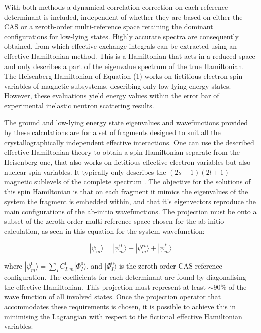 \documentclass[10pt]{article}
\begin{document}
With both methods a dynamical correlation correction on each reference determinant is included, independent of whether they are based on either the CAS or a zeroth-order multi-reference space retaining the dominant configurations for low-lying states. Highly accurate spectra are consequently obtained, from which effective-exchange integrals can be extracted using an effective Hamiltonian method. This is a Hamiltonian that acts in a reduced space and only describes a part of the eigenvalue spectrum of the true Hamiltonian. The Heisenberg Hamiltonian of Equation (1) works on fictitious electron spin variables of magnetic subsystems, describing only low-lying energy states. However, these evaluations yield energy values within the error bar of experimental inelastic neutron scattering results.

The ground and low-lying energy state eigenvalues and wavefunctions provided by these calculations are for a set of fragments designed to suit all the crystallographically independent effective interactions. One can use the described effective Hamiltonian theory to obtain a spin Hamiltonian separate from the Heisenberg one, that also works on fictitious effective electron variables but also nuclear spin variables. It typically only describes the $(2s+1)(2l+1)$ magnetic sublevels of the complete spectrum \cite{mostafanejad2014basics}. The objective for the solutions of this spin Hamiltonian is that on each fragment it mimics the eigenvalues of the system the fragment is embedded within, and that it's eigenvectors reproduce the main configurations of the ab-initio wavefunctions. The projection must be onto a subset of the zeroth-order multi-reference space chosen for the ab-initio calculation, as seen in this equation for the system wavefunction\cite{gelle2009accurate}:

\begin{equation*}
	|\psi_m\rangle = |\psi^0_m\rangle + |\psi^{ct}_m\rangle + |\psi^*_m\rangle
\end{equation*}

where $|\psi^0_m\rangle = \sum_{I}C^0_{I,m}|\Phi^0_I\rangle$, and $|\Phi^0_I\rangle$ is the zeroth order CAS reference configuration. The coefficients for each determinant are found by diagonalising the effective Hamiltonian. This projection must represent at least $\sim90\%$ of the wave function of all involved states. Once the projection operator that accommodates these requirements is chosen, it is possible to achieve this in minimising the Lagrangian with respect to the fictional effective Hamiltonian variables:
\end{document}
